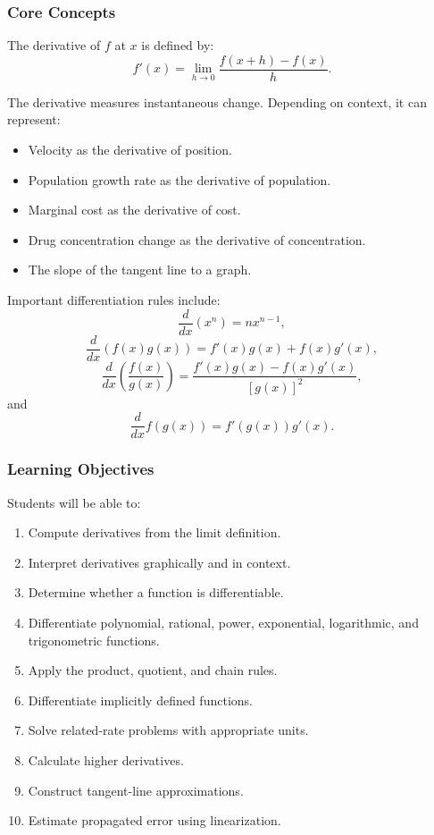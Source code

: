 \documentclass[11pt]{article}
\begin{document}
\subsubsection*{Core Concepts}

The derivative of \(f\) at \(x\) is defined by:
\[
f'(x)=\lim_{h\to 0}\frac{f(x+h)-f(x)}{h}.
\]

The derivative measures instantaneous change. Depending on context, it can represent:

\begin{itemize}
    \item Velocity as the derivative of position.
    \item Population growth rate as the derivative of population.
    \item Marginal cost as the derivative of cost.
    \item Drug concentration change as the derivative of concentration.
    \item The slope of the tangent line to a graph.
\end{itemize}

Important differentiation rules include:
\[
\frac{d}{dx}\left(x^n\right)=nx^{n-1},
\]
\[
\frac{d}{dx}\left(f(x)g(x)\right)=f'(x)g(x)+f(x)g'(x),
\]
\[
\frac{d}{dx}\left(\frac{f(x)}{g(x)}\right)
=
\frac{f'(x)g(x)-f(x)g'(x)}{[g(x)]^2},
\]
and
\[
\frac{d}{dx}f(g(x))=f'(g(x))g'(x).
\]

\subsubsection*{Learning Objectives}

Students will be able to:

\begin{enumerate}[label=\arabic*.]
    \item Compute derivatives from the limit definition.
    \item Interpret derivatives graphically and in context.
    \item Determine whether a function is differentiable.
    \item Differentiate polynomial, rational, power, exponential, logarithmic, and trigonometric functions.
    \item Apply the product, quotient, and chain rules.
    \item Differentiate implicitly defined functions.
    \item Solve related-rate problems with appropriate units.
    \item Calculate higher derivatives.
    \item Construct tangent-line approximations.
    \item Estimate propagated error using linearization.
\end{enumerate}
\end{document}
